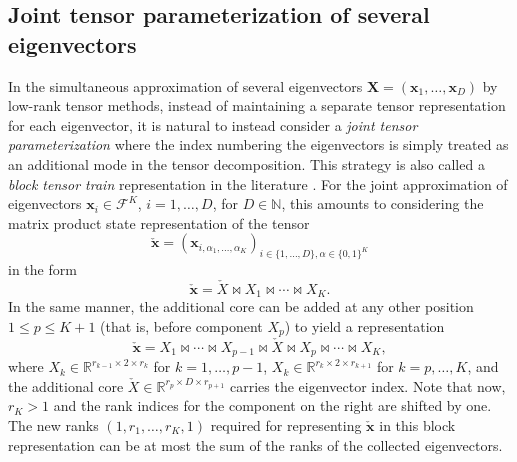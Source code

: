 \documentclass[a4paper,11pt,oneside]{amsart}
\theoremstyle{definition}
\theoremstyle{remark}
\newcommand{\cF}{{\mathcal{F}}}
\newcommand{\R}{\mathbb{R}}
\newcommand{\N}{\mathbb{N}}
\newcommand{\ten}[1]{\boldsymbol{#1}}
\DeclareMathOperator*{\SKP}{\Join}
\numberwithin{equation}{section}
\numberwithin{theorem}{section}
\begin{document}
\subsection{Joint tensor parameterization of several eigenvectors}\label{sec:jointMPS}
In the simultaneous approximation of several eigenvectors $\ten{X} = (\ten{x}_1,\ldots,\ten{x}_D)$ by low-rank tensor methods, instead of maintaining a separate tensor representation for each eigenvector, it is natural to instead consider a \emph{joint tensor parameterization} where the index numbering the eigenvectors is simply treated as an additional mode in the tensor decomposition. This strategy is also called a \emph{block tensor train} representation in the literature \cite{Dolgov:14,KSU:14}.
For the joint approximation of eigenvectors $\ten{x}_i \in \cF^K$, $i=1,\ldots,D$, for $D \in \N$, this amounts to considering the matrix product state representation of the tensor 
\[ 
   \ten{\check x} = ( \ten{x}_{i,\alpha_1,\ldots,\alpha_K} )_{i \in \{1,\ldots,D\}, \alpha \in \{0,1\}^K}
\]
in the form
\[
    \ten{\check x} = \check{X} \SKP X_1 \SKP \cdots \SKP X_K.
\]
In the same manner, the additional core can be added at any other position $1 \leq p \leq K+1$ (that is, before component $X_p$) to yield a representation 
\[
  \ten{\check x} = X_1\SKP \cdots\SKP X_{p-1} \SKP \check{X} \SKP X_{p} \SKP \cdots \SKP X_K,
\]
where $X_k \in \R^{r_{k-1} \times 2 \times r_k}$ for $k=1,\ldots,p-1$, $X_k \in \R^{r_k \times 2 \times r_{k+1}}$ for $k=p,\ldots,K$, and the additional core $\check{X} \in \R^{r_{p} \times D \times r_{p+1}}$ carries the eigenvector index. Note that now, $r_K > 1$ and the rank indices for the component on the right are shifted by one. The new ranks $(1,r_1,\ldots,r_K,1)$ required for representing $\ten{\check x}$ in this block representation can be at most the sum of the ranks of the collected eigenvectors.
%
%
%
%
%
%
%
%
\end{document}
